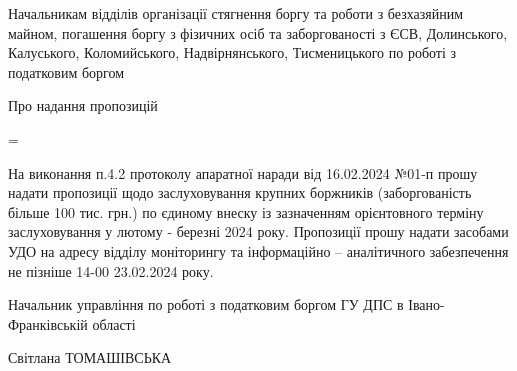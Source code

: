 


\newenvironment{absolutelynopagebreak}
{\par\nobreak\vfil\penalty0\vfilneg
	\vtop\bgroup}
{\par\xdef\tpd{\the\prevdepth}\egroup
	\prevdepth=\tpd}


	\begin{absolutelynopagebreak}
		
		\nobreak
		
		\begin{flushright}
			\begin{minipage}{0.45\textwidth}
				Начальникам відділів організації стягнення боргу та роботи з безхазяйним майном, погашення боргу
				з фізичних осіб та заборгованості з ЄСВ, Долинського, Калуського, Коломийського, Надвірнянського, Тисменицького
				по роботі з податковим боргом
			\end{minipage}
		\end{flushright}
		
		
		\begin{flushleft}
			{\footnotesize 	Про надання пропозицій}
		\end{flushleft}
		
	\end{absolutelynopagebreak}
	
	\vspace{5.8pt}
	
	\setlength{\itemindent}{1.75em} На виконання п.4.2 протоколу апаратної наради від 16.02.2024 №01-п прошу надати пропозиції щодо заслуховування крупних боржників (заборгованість більше 100 тис. грн.) по єдиному внеску із зазначенням орієнтовного терміну заслуховування у лютому - березні 2024 року.
	Пропозиції прошу надати засобами УДО на адресу відділу моніторингу та інформаційно -- аналітичного забезпечення не пізніше 14-00 23.02.2024 року.
	
	
	
	
	
	\vspace{20.8pt}
	
	\begin{minipage}{0.4\textwidth}
		Начальник управління  по роботі з податковим боргом ГУ ДПС в Івано-Франківській області
	\end{minipage}
	\hspace{5ex} \hspace{1ex} \hspace{5ex} {\normalsize Світлана ТОМАШІВСЬКА }
	
	
	\vspace{10.8pt}
	
	\begin{flushleft}
		\hspace{4ex}{\footnotesize 	Вик. Олександр ФРОЛОВ IP2194}
	\end{flushleft}  
	
	
